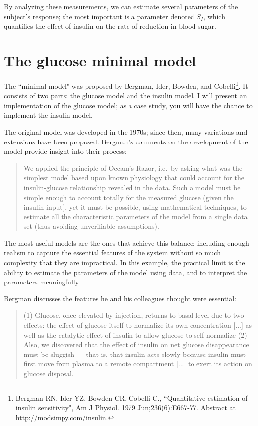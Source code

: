 \documentclass[12pt]{book}
\theoremstyle{exercise}
\begin{document}

By analyzing these measurements, we can estimate several parameters of the subject's response; the most important is a parameter denoted $S_I$, which quantifies the effect of insulin on the rate of reduction in blood sugar.


\section{The glucose minimal model}

The ``minimal model" was proposed by Bergman, Ider, Bowden, and Cobelli\footnote{Bergman RN, Ider YZ, Bowden CR, Cobelli C., ``Quantitative estimation of insulin sensitivity", Am J Physiol. 1979 Jun;236(6):E667-77.  Abstract at \url{http://modsimpy.com/insulin}.}.
It consists of two parts: the glucose model and the insulin model.  I will present an implementation of the glucose model; as a case study, you will have the chance to implement the insulin model.


The original model was developed in the 1970s; since then, many variations and extensions have been proposed.  Bergman's comments on the development of the model provide insight into their process:

\begin{quote}
We applied the principle of Occam's Razor, i.e.~by asking
what was the simplest model based upon known physiology
that could account for the insulin-glucose relationship
revealed in the data. Such a model must be simple
enough to account totally for the measured glucose (given
the insulin input), yet it must be possible, using mathematical
techniques, to estimate all the characteristic parameters
of the model from a single data set (thus avoiding
unverifiable assumptions).
\end{quote}

The most useful models are the ones that achieve this balance: including enough realism to capture the essential features of the system without so much complexity that they are impractical.  In this example, the practical limit is the ability to estimate the parameters of the model using data, and to interpret the parameters meaningfully.


Bergman discusses the features he and his colleagues thought were essential:

\begin{quote}
(1) Glucose, once elevated by injection, returns to basal level due to
two effects: the effect of glucose itself to normalize its own
concentration [...] as well as the catalytic effect of insulin to allow
glucose to self-normalize (2) Also, we discovered
that the effect of insulin on net glucose disappearance
must be sluggish --- that is, that insulin acts slowly because
insulin must first move from plasma to a remote compartment [...] to exert its action on glucose disposal.
\end{quote}
\end{document}
